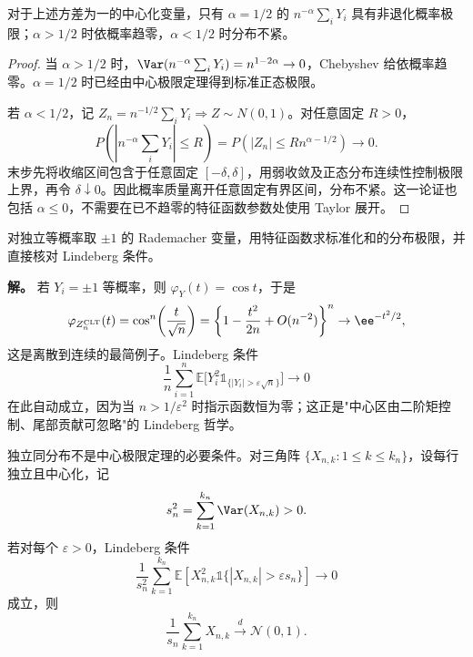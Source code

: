 \begin{proposition}[归一化尺度的非退化性]
对于上述方差为一的中心化变量，只有 $\alpha=1/2$ 的 $n^{-\alpha}\sum_iY_i$ 具有非退化概率极限；$\alpha>1/2$ 时依概率趋零，$\alpha<1/2$ 时分布不紧。
\end{proposition}
\begin{proof}
当 $\alpha>1/2$ 时，$\Var(n^{-\alpha}\sum_iY_i)=n^{1-2\alpha}\to0$，Chebyshev 给依概率趋零。$\alpha=1/2$ 时已经由中心极限定理得到标准正态极限。

若 $\alpha<1/2$，记 $Z_n=n^{-1/2}\sum_iY_i\Rightarrow Z\sim N(0,1)$。对任意固定 $R>0$，
\[
 P\!\left(\left|n^{-\alpha}\sum_iY_i\right|\le R\right)
 =P(|Z_n|\le Rn^{\alpha-1/2})\longrightarrow0.
\]
末步先将收缩区间包含于任意固定 $[-\delta,\delta]$，用弱收敛及正态分布连续性控制极限上界，再令 $\delta\downarrow0$。因此概率质量离开任意固定有界区间，分布不紧。这一论证也包括 $\alpha\le0$，不需要在已不趋零的特征函数参数处使用 Taylor 展开。
\end{proof}

\begin{exbox}[Rademacher 之和]
对独立等概率取 $\pm1$ 的 Rademacher 变量，用特征函数求标准化和的分布极限，并直接核对 Lindeberg 条件。

\textbf{解。} 若 $Y_i=\pm1$ 等概率，则 $\varphi_Y(t)=\cos t$，于是
\[
\varphi_{Z_n^{\rm CLT}}(t)=\cos^n\!\left(\frac{t}{\sqrt n}\right)
=\left\{1-\frac{t^2}{2n}+O(n^{-2})\right\}^n
\to\ee^{-t^2/2},
\]
这是离散到连续的最简例子。Lindeberg 条件
\[
\frac1{n}\sum_{i=1}^n\mathbb E\bigl[Y_i^2\mathds{1}_{\{|Y_i|>\varepsilon\sqrt n\}}\bigr]
\to0
\]
在此自动成立，因为当 $n>1/\varepsilon^2$ 时指示函数恒为零；这正是"中心区由二阶矩控制、尾部贡献可忽略"的 Lindeberg 哲学。
\end{exbox}

\begin{theorem}
独立同分布不是中心极限定理的必要条件。对三角阵 $\{X_{n,k}:1\le k\le k_n\}$，设每行独立且中心化，记
\[
 s_n^2=\sum_{k=1}^{k_n}\Var(X_{n,k})>0.
\]
若对每个 $\varepsilon>0$，Lindeberg 条件
\[
 \frac1{s_n^2}
 \sum_{k=1}^{k_n}
 \mathbb E\!
 \left[X_{n,k}^2\mathds{1}\{|X_{n,k}|>\varepsilon s_n\}\right]
 \to0
\]
成立，则
\[
 \frac1{s_n}\sum_{k=1}^{k_n}X_{n,k}
 \xrightarrow{d}\mathcal N(0,1).
\]
\end{theorem}

